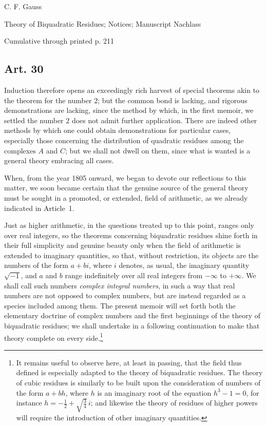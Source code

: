 \documentclass[12pt]{article}
\newcommand{\art}[1]{\subsection*{Art. #1}}
\begin{document}
\begin{center}
{\Large C. F. Gauss}\par
{\large Theory of Biquadratic Residues; Notices; Manuscript Nachlass}\par
{\large Cumulative through printed p. 211}
\end{center}

\art{30}

Induction therefore opens an exceedingly rich harvest of special theorems akin to the theorem for the number $2$; but the common bond is lacking, and rigorous demonstrations are lacking, since the method by which, in the first memoir, we settled the number $2$ does not admit further application. There are indeed other methods by which one could obtain demonstrations for particular cases, especially those concerning the distribution of quadratic residues among the complexes $A$ and $C$; but we shall not dwell on them, since what is wanted is a general theory embracing all cases.

When, from the year 1805 onward, we began to devote our reflections to this matter, we soon became certain that the genuine source of the general theory must be sought in a promoted, or extended, field of arithmetic, as we already indicated in Article~1.

Just as higher arithmetic, in the questions treated up to this point, ranges only over real integers, so the theorems concerning biquadratic residues shine forth in their full simplicity and genuine beauty only when the field of arithmetic is extended to imaginary quantities, so that, without restriction, its objects are the numbers of the form $a+bi$, where $i$ denotes, as usual, the imaginary quantity $\sqrt{-1}$, and $a$ and $b$ range indefinitely over all real integers from $-\infty$ to $+\infty$. We shall call such numbers \textit{complex integral numbers}, in such a way that real numbers are not opposed to complex numbers, but are instead regarded as a species included among them. The present memoir will set forth both the elementary doctrine of complex numbers and the first beginnings of the theory of biquadratic residues; we shall undertake in a following continuation to make that theory complete on every side.\footnote{It remains useful to observe here, at least in passing, that the field thus defined is especially adapted to the theory of biquadratic residues. The theory of cubic residues is similarly to be built upon the consideration of numbers of the form $a+bh$, where $h$ is an imaginary root of the equation $h^3-1=0$, for instance $h=-\frac{1}{2}+\sqrt{\frac{3}{4}}\,i$; and likewise the theory of residues of higher powers will require the introduction of other imaginary quantities.}
\end{document}
